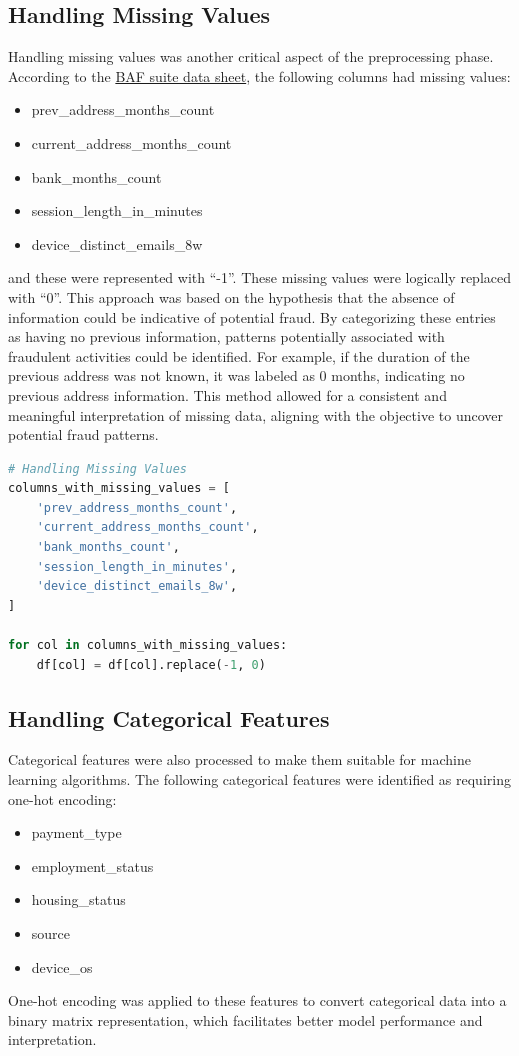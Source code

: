 \documentclass[12pt,a4paper]{report}
\begin{document}
\subsection{Handling Missing Values}
Handling missing values was another critical aspect of the preprocessing phase. According to the \href{https://github.com/feedzai/bank-account-fraud/blob/main/documents/datasheet.pdf}{BAF suite data sheet}, the following columns had missing values:
\begin{itemize}
    \item prev\_address\_months\_count
    \item current\_address\_months\_count
    \item bank\_months\_count
    \item session\_length\_in\_minutes
    \item device\_distinct\_emails\_8w
\end{itemize}
and these were represented with ``-1''. These missing values were logically replaced with ``0''. This approach was based on the hypothesis that the absence of information could be indicative of potential fraud. By categorizing these entries as having no previous information, patterns potentially associated with fraudulent activities could be identified. For example, if the duration of the previous address was not known, it was labeled as 0 months, indicating no previous address information. This method allowed for a consistent and meaningful interpretation of missing data, aligning with the objective to uncover potential fraud patterns.\\


\begin{lstlisting}[language=Python, caption={Handling Missing Values in the Dataset}]
# Handling Missing Values
columns_with_missing_values = [
    'prev_address_months_count',
    'current_address_months_count', 
    'bank_months_count',
    'session_length_in_minutes',
    'device_distinct_emails_8w', 
]

for col in columns_with_missing_values:
    df[col] = df[col].replace(-1, 0)
\end{lstlisting}


\subsection{Handling Categorical Features}
Categorical features were also processed to make them suitable for machine learning algorithms. The following categorical features were identified as requiring one-hot encoding:
\begin{itemize}
    \item payment\_type
    \item employment\_status
    \item housing\_status
    \item source
    \item device\_os
\end{itemize}
One-hot encoding was applied to these features to convert categorical data into a binary matrix representation, which facilitates better model performance and interpretation.
\end{document}
